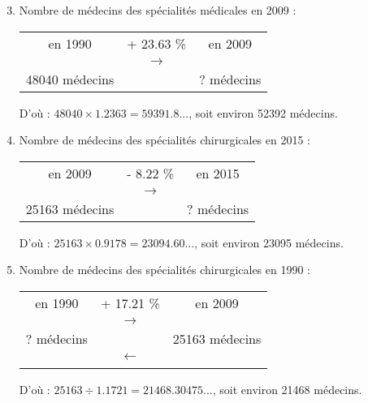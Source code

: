 \documentclass[xcolor={dvipsnames}]{beamer}
\begin{document}
\begin{frame}{}

\begin{enumerate}%
	\setcounter{enumi}{2}
	\item Nombre de médecins des spécialités médicales en 2009 :\pause
	
	\begin{table}[h!]
		\centering
		\begin{tabular}{|ccc|}
			\hline
			en \num{1990} & + \num{23.63} \%  & en \num{2009} \\
			& {\LARGE $\rightarrow$} &			\\
			\num{48040} médecins& $ $ & ? médecins \\
			\hline
		\end{tabular}
	\end{table}\pause
	
	D'où : $\num{48040} \times \num{1.2363} = \num{59391.8}...$, soit environ \num{52392} médecins.\pause
	
	\item Nombre de médecins des spécialités chirurgicales en 2015 :\pause
	
	\begin{table}[h!]
		\centering
		\begin{tabular}{|ccc|}
			\hline
			en \num{2009} & - \num{8.22} \%  & en \num{2015} \\
			& {\LARGE $\rightarrow$} &			\\
			\num{25163} médecins& $ $ & ? médecins \\
			\hline
		\end{tabular}
	\end{table}\pause
	
	D'où : $\num{25163} \times \num{0.9178} = \num{23094.60}...$, soit environ \num{23095} médecins.
\end{enumerate}
\end{frame}


\begin{frame}{}

\begin{enumerate}%
	\setcounter{enumi}{4}
	\item  Nombre de médecins des spécialités chirurgicales en 1990 : \pause
	
	\begin{table}[h!]
		\centering
		\begin{tabular}{|ccc|}
			\hline
			en \num{1990} & + \num{17.21} \%  & en \num{2009} \\
			& {\LARGE $\rightarrow$} &			\\
			? médecins& $ $ & 25163 médecins \\
			\hline
			& {\LARGE $\leftarrow$} & \\
			& $ $ & \\
			\hline
		\end{tabular}
	\end{table}\pause
	
	D'où : $\num{25163} \div \num{1.1721} = \num{21468.30475}...$, soit environ \num{21468} médecins.
\end{enumerate}
\end{frame}
\end{document}
